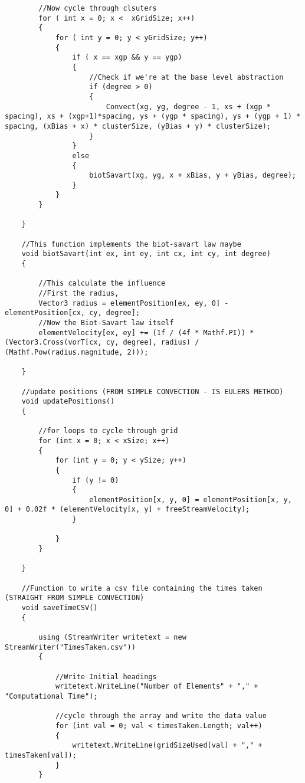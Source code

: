 \begin{mdframed}[linecolor=black, topline=true, bottomline=true,
  leftline=false, rightline=false]
\begin{verbatim}
        //Now cycle through clsuters
        for ( int x = 0; x <  xGridSize; x++)
        {
            for ( int y = 0; y < yGridSize; y++)
            {
                if ( x == xgp && y == ygp)
                {
                    //Check if we're at the base level abstraction
                    if (degree > 0)
                    {
                        Convect(xg, yg, degree - 1, xs + (xgp * spacing), xs + (xgp+1)*spacing, ys + (ygp * spacing), ys + (ygp + 1) * spacing, (xBias + x) * clusterSize, (yBias + y) * clusterSize);
                    }                
                }
                else
                {
                    biotSavart(xg, yg, x + xBias, y + yBias, degree);
                }
            }
        }

    }

    //This function implements the biot-savart law maybe
    void biotSavart(int ex, int ey, int cx, int cy, int degree)
    {

        //This calculate the influence
        //First the radius,
        Vector3 radius = elementPosition[ex, ey, 0] - elementPosition[cx, cy, degree];
        //Now the Biot-Savart law itself
        elementVelocity[ex, ey] += (1f / (4f * Mathf.PI)) * (Vector3.Cross(vorT[cx, cy, degree], radius) / (Mathf.Pow(radius.magnitude, 2)));

    }

    //update positions (FROM SIMPLE CONVECTION - IS EULERS METHOD)
    void updatePositions()
    {

        //for loops to cycle through grid
        for (int x = 0; x < xSize; x++)
        {
            for (int y = 0; y < ySize; y++)
            {
                if (y != 0)
                {
                    elementPosition[x, y, 0] = elementPosition[x, y, 0] + 0.02f * (elementVelocity[x, y] + freeStreamVelocity);
                }
                
            }
        }

    }

    //Function to write a csv file containing the times taken (STRAIGHT FROM SIMPLE CONVECTION)
    void saveTimeCSV()
    {

        using (StreamWriter writetext = new StreamWriter("TimesTaken.csv"))
        {

            //Write Initial headings
            writetext.WriteLine("Number of Elements" + "," + "Computational Time");

            //cycle through the array and write the data value
            for (int val = 0; val < timesTaken.Length; val++)
            {
                writetext.WriteLine(gridSizeUsed[val] + "," + timesTaken[val]);
            }
        }


\end{verbatim}
\end{mdframed}
